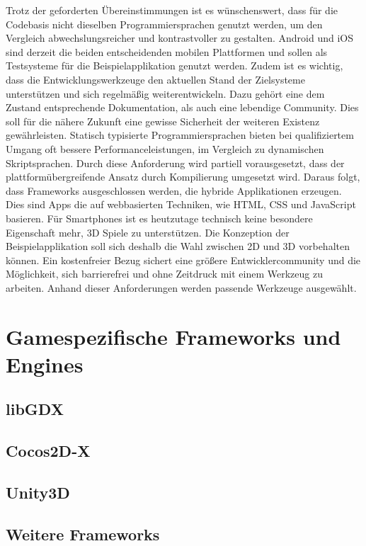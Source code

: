 Trotz der geforderten Übereinstimmungen ist es wünschenswert, dass für die Codebasis nicht dieselben Programmiersprachen genutzt werden, um den Vergleich abwechslungsreicher und kontrastvoller zu gestalten. Android und iOS sind derzeit die beiden entscheidenden mobilen Plattformen und sollen als Testsysteme für die Beispielapplikation genutzt werden. Zudem ist es wichtig, dass die Entwicklungswerkzeuge den aktuellen Stand der Zielsysteme unterstützen und sich regelmäßig weiterentwickeln. Dazu gehört eine dem Zustand entsprechende Dokumentation, als auch eine lebendige Community. Dies soll für die nähere Zukunft eine gewisse Sicherheit der weiteren Existenz gewährleisten. Statisch typisierte Programmiersprachen bieten bei qualifiziertem Umgang oft bessere Performanceleistungen, im Vergleich zu dynamischen Skriptsprachen. Durch diese Anforderung wird partiell vorausgesetzt, dass der plattformübergreifende Ansatz durch Kompilierung umgesetzt wird. Daraus folgt, dass Frameworks ausgeschlossen werden, die hybride Applikationen erzeugen. Dies sind Apps die auf webbasierten Techniken, wie HTML, CSS und JavaScript basieren. Für Smartphones ist es heutzutage technisch keine besondere Eigenschaft mehr, 3D Spiele zu unterstützen. Die Konzeption der Beispielapplikation soll sich deshalb die Wahl zwischen 2D und 3D vorbehalten können. Ein kostenfreier Bezug sichert eine größere Entwicklercommunity und die Möglichkeit, sich barrierefrei und ohne Zeitdruck mit einem Werkzeug zu arbeiten. Anhand dieser Anforderungen werden passende Werkzeuge ausgewählt.

\section{Gamespezifische Frameworks und Engines}
\subsection{libGDX}
\subsection{Cocos2D-X}
\subsection{Unity3D}
\subsection{Weitere Frameworks}

